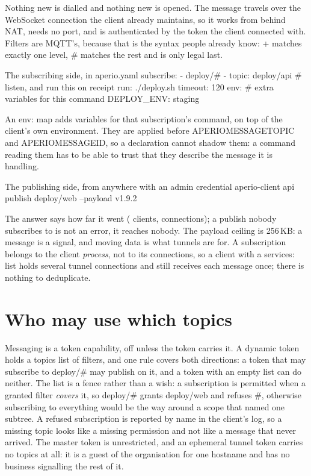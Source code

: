 \documentclass[11pt,a4paper,oneside]{book}
\newcommand{\aperiobreakableunderscore}{\textunderscore\allowbreak}
\newcommand{\aperiocodebreaks}{\XeTeXinterchartokenstate=1 }
\newcommand{\aperiocodebreaks}{}
\DeclareRobustCommand{\code}[1]{{\ttfamily\small\aperiocodebreaks
  \let\_\aperiobreakableunderscore#1}}
\begin{document}
Nothing new is dialled and nothing new is opened. The message travels
over the WebSocket connection the client already maintains, so it works
from behind NAT, needs no port, and is authenticated by the token the
client connected with. Filters are MQTT's, because that is the syntax
people already know: \code{+} matches exactly one level, \code{\#}
matches the rest and is only legal last.

\begin{codecard}[aperioyaml]{The subscribing side, in aperio.yaml}
subscribe:
  - deploy/#
  - topic: deploy/api      # listen, and run this on receipt
    run: ./deploy.sh
    timeout: 120
    env:                   # extra variables for this command
      DEPLOY_ENV: staging
\end{codecard}

An \code{env:} map adds variables for that subscription's command, on top
of the client's own environment. They are applied before
\code{APERIO\_MESSAGE\_TOPIC} and \code{APERIO\_MESSAGE\_ID}, so a
declaration cannot shadow them: a command reading them has to be able to
trust that they describe the message it is handling.

\begin{codecard}[aperiosh]{The publishing side, from anywhere with an admin credential}
aperio-client api publish deploy/web --payload v1.9.2
\end{codecard}

The answer says how far it went (\code{clients}, \code{connections});
a publish nobody subscribes to is not an error, it reaches nobody. The
payload ceiling is 256\,KB: a message is a signal, and moving data is
what tunnels are for. A subscription belongs to the client
\emph{process}, not to its connections, so a client with a
\code{services:} list holds several tunnel connections and still
receives each message once; there is nothing to deduplicate.

\section{Who may use which topics}

Messaging is a token capability, off unless the token carries it. A
dynamic token holds a \code{topics} list of filters, and one rule covers
both directions: a token that may subscribe to \code{deploy/\#} may
publish on it, and a token with an empty list can do neither. The list
is a fence rather than a wish: a subscription is permitted when a
granted filter \emph{covers} it, so \code{deploy/\#} grants
\code{deploy/web} and refuses \code{\#}, otherwise subscribing to
everything would be the way around a scope that named one subtree. A
refused subscription is reported by name in the client's log, so a
missing topic looks like a missing permission and not like a message
that never arrived. The master token is unrestricted, and an ephemeral
tunnel token carries no topics at all: it is a guest of the organisation
for one hostname and has no business signalling the rest of it.
\end{document}
